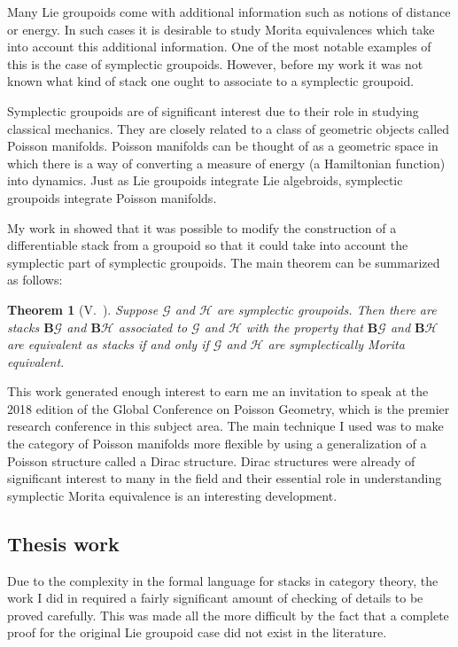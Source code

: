 \documentclass[11pt, letterpaper]{article}
\renewcommand{\H}{\mathcal{H}}
\newcommand{\B}{\mathbf{B}}
\newcommand{\G}{\mathcal{G}}
\newtheorem{theorem}{Theorem}
\begin{document}
Many Lie groupoids come with additional information such as notions of distance or energy. In such cases it is desirable to study Morita equivalences which take into account this additional information. One of the most notable examples of this is the case of symplectic groupoids. However, before my work it was not known what kind of stack one ought to associate to a symplectic groupoid.

Symplectic groupoids are of significant interest due to their role in studying classical mechanics. They are closely related to a class of geometric objects called Poisson manifolds. Poisson manifolds can be thought of as a geometric space in which there is a way of converting a measure of energy (a Hamiltonian function) into dynamics. Just as Lie groupoids integrate Lie algebroids, symplectic groupoids integrate Poisson manifolds.

My work in \cite{dman} showed that it was possible to modify the construction of a differentiable stack from a groupoid so that it could take into account the symplectic part of symplectic groupoids. The main theorem can be summarized as follows:
\begin{theorem}[V.~\cite{dman}]\label{thm:dman}
Suppose \( \G \) and \( \H \) are \emph{symplectic} groupoids. Then there are stacks \( \B \G \) and \( \B \H \) associated to \( \G \) and \( \H \) with the property that \( \B \G \) and \( \B \H \) are equivalent as stacks if and only if \( \G \) and \( \H \) are symplectically Morita equivalent.
\end{theorem}
This work generated enough interest to earn me an invitation to speak at the 2018 edition of the Global Conference on Poisson Geometry, which is the premier research conference in this subject area. The main technique I used was to make the category of Poisson manifolds more flexible by using a generalization of a Poisson structure called a Dirac structure. Dirac structures were already of significant interest to many in the field and their essential role in understanding symplectic Morita equivalence is an interesting development.
\subsection{Thesis work}
Due to the complexity in the formal language for stacks in category theory, the work I did in \cite{dman} required a fairly significant amount of checking of details to be proved carefully. This was made all the more difficult by the fact that a complete proof for the original Lie groupoid case did not exist in the literature. 
\end{document}
